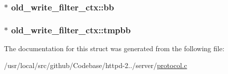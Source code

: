 \subsubsection[{\texorpdfstring{bb}{bb}}]{$\ast$ old\+\_\+write\+\_\+filter\+\_\+ctx\+::bb}\hypertarget{structold__write__filter__ctx_a2c6961e4fddedf1bdddcb91f5318ae65}{}\label{structold__write__filter__ctx_a2c6961e4fddedf1bdddcb91f5318ae65}
\subsubsection[{\texorpdfstring{tmpbb}{tmpbb}}]{$\ast$ old\+\_\+write\+\_\+filter\+\_\+ctx\+::tmpbb}\hypertarget{structold__write__filter__ctx_abbb663a31407f6094d19697da0bd5cb5}{}\label{structold__write__filter__ctx_abbb663a31407f6094d19697da0bd5cb5}


The documentation for this struct was generated from the following file\+:\begin{DoxyCompactItemize}
\item 
/usr/local/src/github/\+Codebase/httpd-\/2../server/\hyperlink{protocol_8c}{protocol.\+c}\end{DoxyCompactItemize}
